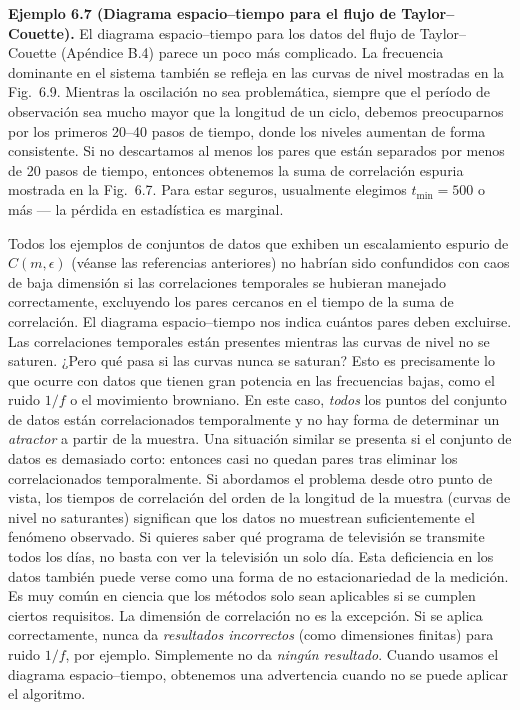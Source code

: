 \documentclass[10pt,a4paper]{book}
\begin{document}
\bigskip

\textbf{Ejemplo 6.7 (Diagrama espacio–tiempo para el flujo de Taylor–Couette).} El diagrama espacio–tiempo para los datos del flujo de Taylor–Couette (Apéndice B.4) parece un poco más complicado. La frecuencia dominante en el sistema también se refleja en las curvas de nivel mostradas en la Fig.~6.9. Mientras la oscilación no sea problemática, siempre que el período de observación sea mucho mayor que la longitud de un ciclo, debemos preocuparnos por los primeros 20–40 pasos de tiempo, donde los niveles aumentan de forma consistente. Si no descartamos al menos los pares que están separados por menos de 20 pasos de tiempo, entonces obtenemos la suma de correlación espuria mostrada en la Fig.~6.7. Para estar seguros, usualmente elegimos $t_{\min} = 500$ o más — la pérdida en estadística es marginal. 

\bigskip

Todos los ejemplos de conjuntos de datos que exhiben un escalamiento espurio de $C(m, \epsilon)$ (véanse las referencias anteriores) no habrían sido confundidos con caos de baja dimensión si las correlaciones temporales se hubieran manejado correctamente, excluyendo los pares cercanos en el tiempo de la suma de correlación. El diagrama espacio–tiempo nos indica cuántos pares deben excluirse. Las correlaciones temporales están presentes mientras las curvas de nivel no se saturen. ¿Pero qué pasa si las curvas nunca se saturan? Esto es precisamente lo que ocurre con datos que tienen gran potencia en las frecuencias bajas, como el ruido $1/f$ o el movimiento browniano. En este caso, \textit{todos} los puntos del conjunto de datos están correlacionados temporalmente y no hay forma de determinar un \textit{atractor} a partir de la muestra. Una situación similar se presenta si el conjunto de datos es demasiado corto: entonces casi no quedan pares tras eliminar los correlacionados temporalmente. Si abordamos el problema desde otro punto de vista, los tiempos de correlación del orden de la longitud de la muestra (curvas de nivel no saturantes) significan que los datos no muestrean suficientemente el fenómeno observado. Si quieres saber qué programa de televisión se transmite todos los días, no basta con ver la televisión un solo día. Esta deficiencia en los datos también puede verse como una forma de no estacionariedad de la medición. Es muy común en ciencia que los métodos solo sean aplicables si se cumplen ciertos requisitos. La dimensión de correlación no es la excepción. Si se aplica correctamente, nunca da \textit{resultados incorrectos} (como dimensiones finitas) para ruido $1/f$, por ejemplo. Simplemente no da \textit{ningún resultado}. Cuando usamos el diagrama espacio–tiempo, obtenemos una advertencia cuando no se puede aplicar el algoritmo.
\end{document}
